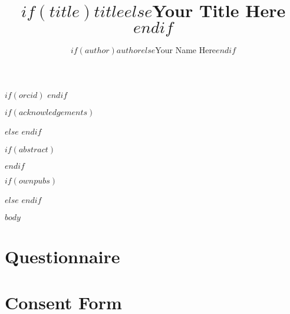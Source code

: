 \documentclass[11pt]{caltech_thesis}
\begin{document}
\title{$if(title)$$title$$else$Your Title Here$endif$}
\author{$if(author)$$author$$else$Your Name Here$endif$}
\address{Pasadena, California}                     
$if(orcid)$       
$endif$


\maketitle[logo]

$if(acknowledgements)$
\begin{acknowledgements}   
    
\end{acknowledgements}
$else$
$endif$

$if(abstract)$
\begin{abstract}
   
\end{abstract}
$endif$

$if(ownpubs)$
\begin{publishedcontent}

\end{publishedcontent}
$else$
$endif$

\tableofcontents
\listoffigures
\listoftables
\printnomenclature
\mainmatter

$body$

\chapter{Questionnaire}
\chapter{Consent Form}
\printindex
\end{document}
